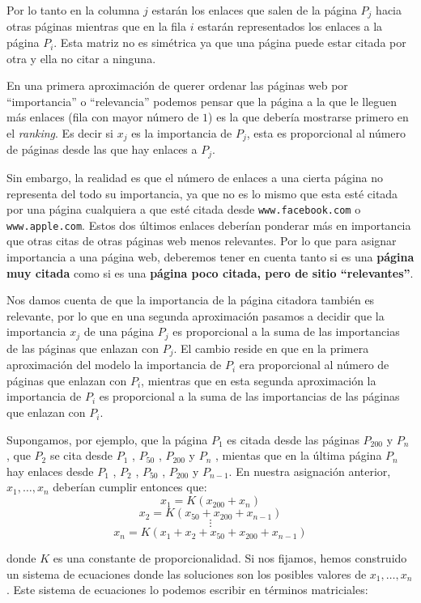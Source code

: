 \documentclass[size=a4, parskip=half, titlepage=false, toc=flat, toc=bib, 12pt]{scrartcl}
\theoremstyle{theorem-style}
\theoremstyle{definition-style}
\theoremstyle{remark-style}
\theoremstyle{example-style}
\theoremstyle{definition-style}
\theoremstyle{remark-style}
\begin{document}
Por lo tanto en la columna $j$ estarán los enlaces que salen de la página $P_j$ hacia otras páginas
mientras que en la fila $i$ estarán representados los enlaces a la página $P_i$. Esta matriz
no es simétrica ya que una página puede estar citada por otra y ella no citar a ninguna.

En una primera aproximación de querer ordenar las páginas web por ``importancia'' o ``relevancia'' podemos pensar que la página a la que le lleguen más enlaces (fila con mayor número de $1$) es la que debería mostrarse primero en el \textit{ranking}. Es decir si $x_j$ es la importancia de $P_j$, esta es proporcional al número de páginas desde las que hay enlaces a $P_j$.

Sin embargo, la realidad es que el número de enlaces a una cierta página no representa del todo su importancia, ya que no es lo mismo que esta esté citada por una página cualquiera a que esté citada desde \verb|www.facebook.com| o \verb|www.apple.com|. Estos dos últimos enlaces deberían ponderar más en importancia que otras citas de otras páginas web menos relevantes. Por lo que para asignar importancia a una página web, deberemos tener en cuenta tanto si es una \textbf{página muy citada} como si es una \textbf{página poco citada, pero de sitio ``relevantes''}.

Nos damos cuenta de que la importancia de la página citadora también es relevante, por lo que en una segunda aproximación pasamos a decidir que la importancia $x_j$ de una página $P_j$ es proporcional a la suma de las importancias de las páginas que enlazan con $P_j$. El cambio reside en que en la primera aproximación del modelo la importancia de $P_i$ era proporcional al número de páginas que enlazan con $P_i$, mientras que en esta segunda aproximación la importancia de $P_i$ es proporcional a la suma de las importancias de las páginas que enlazan con $P_i$.

Supongamos, por ejemplo, que la página $P_1$ es citada desde las páginas $P_{200}$ y $P_{n}$ ,
 que $P_2$ se cita desde $P_1$ , $P_{50}$ , $P_{200}$ y $P_n$ , mientas que en la última página $P_n$ hay enlaces desde $P_1$ , $P_2$ , $P_{50}$ , $P_{200}$ y $P_{n-1}$. En nuestra asignación anterior, $x_1, \dots , x_n$ deberían
 cumplir entonces que:
 $$ x_1 = K (x_{200} + x_n) $$
 $$ x_2 = K (x_{50} + x_{200} + x_{n-1}) $$
 $$ \vdots $$
 $$x_n = K (x_1 + x_2 + x_{50} + x_{200} + x_{n-1}) $$

donde $K$ es una constante de proporcionalidad. Si nos fijamos, hemos construido un sistema de ecuaciones
donde las soluciones son los posibles valores de $x_1, \dots , x_n$. Este sistema de ecuaciones
lo podemos escribir en términos matriciales:
\end{document}
